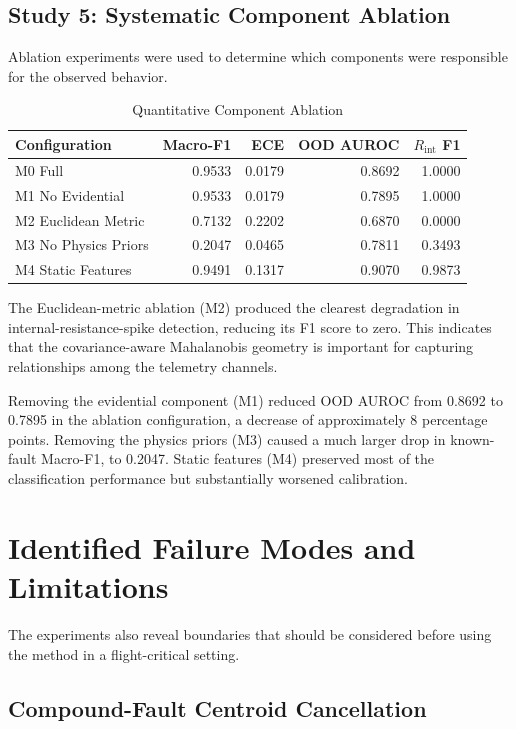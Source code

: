 \documentclass[conference]{IEEEtran}
\begin{document}
\subsection{Study 5: Systematic Component Ablation}

Ablation experiments were used to determine which components were responsible
for the observed behavior.

\begin{table}[t]
\centering
\caption{Quantitative Component Ablation}
\label{tab:ablation}
\small
\begin{tabular}{lrrrr}
\toprule
Configuration & Macro-F1 & ECE & OOD AUROC & $R_{\mathrm{int}}$ F1\\
\midrule
M0 Full & 0.9533 & 0.0179 & 0.8692 & 1.0000\\
M1 No Evidential & 0.9533 & 0.0179 & 0.7895 & 1.0000\\
M2 Euclidean Metric & 0.7132 & 0.2202 & 0.6870 & 0.0000\\
M3 No Physics Priors & 0.2047 & 0.0465 & 0.7811 & 0.3493\\
M4 Static Features & 0.9491 & 0.1317 & 0.9070 & 0.9873\\
\bottomrule
\end{tabular}
\end{table}

The Euclidean-metric ablation (M2) produced the clearest degradation in
internal-resistance-spike detection, reducing its F1 score to zero. This
indicates that the covariance-aware Mahalanobis geometry is important for
capturing relationships among the telemetry channels.

Removing the evidential component (M1) reduced OOD AUROC from 0.8692 to
0.7895 in the ablation configuration, a decrease of approximately 8
percentage points. Removing the physics priors (M3) caused a much larger
drop in known-fault Macro-F1, to 0.2047. Static features (M4) preserved most
of the classification performance but substantially worsened calibration.

\section{Identified Failure Modes and Limitations}

The experiments also reveal boundaries that should be considered before using
the method in a flight-critical setting.

\subsection{Compound-Fault Centroid Cancellation}
\end{document}

